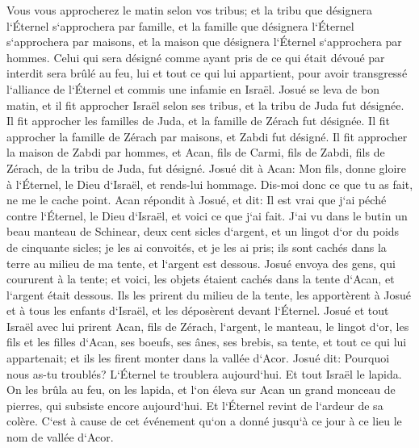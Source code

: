 \verse Vous vous approcherez le matin selon vos tribus; et la tribu que désignera l`Éternel s`approchera par famille, et la famille que désignera l`Éternel s`approchera par maisons, et la maison que désignera l`Éternel s`approchera par hommes. 
\verse Celui qui sera désigné comme ayant pris de ce qui était dévoué par interdit sera brûlé au feu, lui et tout ce qui lui appartient, pour avoir transgressé l`alliance de l`Éternel et commis une infamie en Israël. 
\verse Josué se leva de bon matin, et il fit approcher Israël selon ses tribus, et la tribu de Juda fut désignée. 
\verse Il fit approcher les familles de Juda, et la famille de Zérach fut désignée. Il fit approcher la famille de Zérach par maisons, et Zabdi fut désigné. 
\verse Il fit approcher la maison de Zabdi par hommes, et Acan, fils de Carmi, fils de Zabdi, fils de Zérach, de la tribu de Juda, fut désigné. 
\verse Josué dit à Acan: Mon fils, donne gloire à l`Éternel, le Dieu d`Israël, et rends-lui hommage. Dis-moi donc ce que tu as fait, ne me le cache point. 
\verse Acan répondit à Josué, et dit: Il est vrai que j`ai péché contre l`Éternel, le Dieu d`Israël, et voici ce que j`ai fait. 
\verse J`ai vu dans le butin un beau manteau de Schinear, deux cent sicles d`argent, et un lingot d`or du poids de cinquante sicles; je les ai convoités, et je les ai pris; ils sont cachés dans la terre au milieu de ma tente, et l`argent est dessous. 
\verse Josué envoya des gens, qui coururent à la tente; et voici, les objets étaient cachés dans la tente d`Acan, et l`argent était dessous. 
\verse Ils les prirent du milieu de la tente, les apportèrent à Josué et à tous les enfants d`Israël, et les déposèrent devant l`Éternel. 
\verse Josué et tout Israël avec lui prirent Acan, fils de Zérach, l`argent, le manteau, le lingot d`or, les fils et les filles d`Acan, ses boeufs, ses ânes, ses brebis, sa tente, et tout ce qui lui appartenait; et ils les firent monter dans la vallée d`Acor. 
\verse Josué dit: Pourquoi nous as-tu troublés? L`Éternel te troublera aujourd`hui. Et tout Israël le lapida. On les brûla au feu, on les lapida, 
\verse et l`on éleva sur Acan un grand monceau de pierres, qui subsiste encore aujourd`hui. Et l`Éternel revint de l`ardeur de sa colère. C`est à cause de cet événement qu`on a donné jusqu`à ce jour à ce lieu le nom de vallée d`Acor. 

\chapter{}

